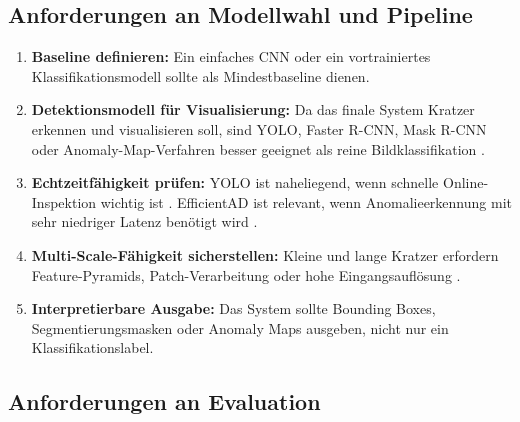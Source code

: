 \documentclass[11pt,a4paper]{article}
\begin{document}
\subsection{Anforderungen an Modellwahl und Pipeline}

\begin{enumerate}
    \item \textbf{Baseline definieren:} Ein einfaches CNN oder ein vortrainiertes Klassifikationsmodell sollte als Mindestbaseline dienen.
    \item \textbf{Detektionsmodell für Visualisierung:} Da das finale System Kratzer erkennen und visualisieren soll, sind YOLO, Faster R-CNN, Mask R-CNN oder Anomaly-Map-Verfahren besser geeignet als reine Bildklassifikation \cite{projektaufgabe}.
    \item \textbf{Echtzeitfähigkeit prüfen:} YOLO ist naheliegend, wenn schnelle Online-Inspektion wichtig ist \cite{applications_review}. EfficientAD ist relevant, wenn Anomalieerkennung mit sehr niedriger Latenz benötigt wird \cite{efficientad_results}.
    \item \textbf{Multi-Scale-Fähigkeit sicherstellen:} Kleine und lange Kratzer erfordern Feature-Pyramids, Patch-Verarbeitung oder hohe Eingangsauflösung \cite{applications_review}.
    \item \textbf{Interpretierbare Ausgabe:} Das System sollte Bounding Boxes, Segmentierungsmasken oder Anomaly Maps ausgeben, nicht nur ein Klassifikationslabel.
\end{enumerate}

\subsection{Anforderungen an Evaluation}
\end{document}
